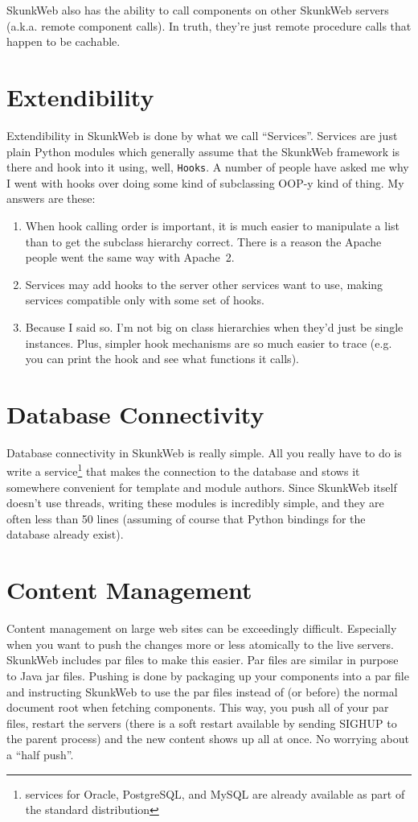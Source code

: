 \documentclass[twocolumn]{article}
\begin{document}
SkunkWeb also has the ability to call components on other SkunkWeb
servers (a.k.a. remote component calls).  In truth, they're just
remote procedure calls that happen to be cachable.

\section{Extendibility}
\label{services}
Extendibility in SkunkWeb is done by what we call ``Services''.
Services are just plain Python modules which generally assume that the
SkunkWeb framework is there and hook into it using, well,
\texttt{Hooks}.  A number of people have asked me why I went with
hooks over doing some kind of subclassing OOP-y kind of thing.  My
answers are these:
\begin{enumerate}
\item When hook calling order is important, it is much easier to
manipulate a list than to get the subclass hierarchy correct.  There
is a reason the Apache people went the same way with Apache~2.
\item Services may add hooks to the server other services want to
use, making services compatible only with some set of hooks.
\item Because I said so.  I'm not big on class hierarchies when
they'd just be single instances.  Plus, simpler hook mechanisms are so
much easier to trace (e.g. you can print the hook and see what
functions it calls).
\end{enumerate}


\section{Database Connectivity}
Database connectivity in SkunkWeb is really simple.  All you really
have to do is write a service\footnote{services for
Oracle\cite{oracle}, PostgreSQL\cite{postgres}, and MySQL\cite{mysql}
are already available as part of the standard distribution} that makes
the connection to the database and stows it somewhere convenient for
template and module authors.  Since SkunkWeb itself doesn't use
threads, writing these modules is incredibly simple, and they are
often less than 50 lines (assuming of course that Python bindings for
the database already exist).

\section{Content Management}
Content management on large web sites can be exceedingly difficult.
Especially when you want to push the changes more or less atomically
to the live servers.  SkunkWeb includes par files to make this
easier.  Par files are similar in purpose to Java\cite{java} jar
files.  Pushing is done by packaging  up your components into a par file and
instructing SkunkWeb to use the par files instead of (or before) the
normal document root when fetching components.  This way, you push all
of your par files, restart the servers (there is a soft restart
available by sending SIGHUP to the parent process)
and the new content shows up all at once.  No worrying about a ``half
push''.
\end{document}
